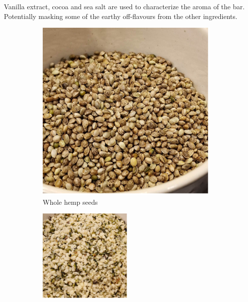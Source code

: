 \vspace{1em}
Vanilla extract, cocoa and sea salt are used to characterize the aroma of the bar. Potentially masking some of the earthy off-flavours from the other ingredients. 


\begin{figure}[h]
    \centering
    \begin{subfigure}{0.45\textwidth}
        \centering
        \includegraphics[width=\linewidth]{Figures/fig_formulation_06.png}
        \caption{Whole hemp seeds}
        \label{fig:whole_hemp}
    \end{subfigure}
    \hfill
    \begin{subfigure}{0.45\textwidth}
        \centering
        \includegraphics[width=\linewidth]{Figures/fig_formulation_06.1.png}

\end{subfigure}
\end{figure}
